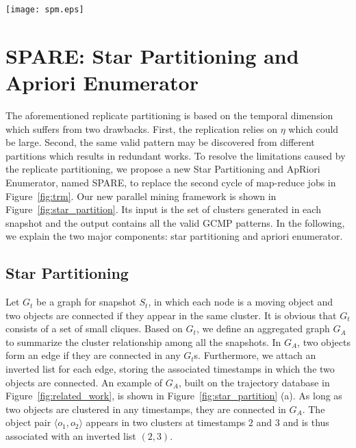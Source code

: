 
\begin{figure*}[t]
\centering
\texttt{[image: spm.eps]}
\caption{Star partition and ApRiori Enumerator (SPARE). (a) Aggregate graph from Figure 1. (b) Five stars are generated, star IDs are circled, the vertexes and inverted lists are in the connected tables.
(c) Apriori Enumerator with various pruning techniques.}
\label{fig:star_partition}
\end{figure*}

\section{SPARE: Star Partitioning and Apriori Enumerator}
\label{sec:spm}
The aforementioned replicate partitioning is based on the temporal dimension which suffers from two drawbacks. First, the replication relies on $\eta$ which could be large. Second, the same valid pattern may be discovered from different partitions which results in redundant works.
To resolve the limitations caused by the replicate partitioning, 
we propose a new Star Partitioning and ApRiori Enumerator, named SPARE, 
to replace the second cycle of map-reduce jobs in Figure~\ref{fig:trm}. 
Our new parallel mining framework is shown in Figure~\ref{fig:star_partition}. 
Its input is the set of clusters generated in each snapshot and the output 
contains all the valid GCMP patterns. In the following, we explain the two major components: 
star partitioning and apriori enumerator.


\subsection{Star Partitioning}
Let $G_t$ be a graph for snapshot $S_t$, in which each node 
is a moving object and two objects are connected if they appear 
in the same cluster. It is obvious that $G_t$ consists of a set of small cliques. 
Based on $G_t$, we define an aggregated graph $G_A$ to summarize the 
cluster relationship among all the snapshots. In $G_A$, two objects
form an edge if they are connected in any $G_t$s. Furthermore, 
we attach an inverted list for each edge, 
storing the associated timestamps in which the two objects are connected. 
An example of $G_A$, built on the trajectory database in Figure~\ref{fig:related_work}, 
is shown in Figure~\ref{fig:star_partition} (a). 
As long as two objects are clustered in any timestamps, they are connected in $G_A$. 
The object pair $\langle o_1,o_2 \rangle$ appears in two clusters at timestamps 
$2$ and $3$ and is thus associated with an inverted list $(2,3)$.


